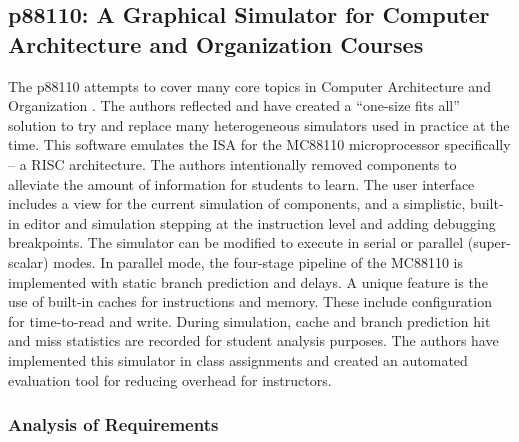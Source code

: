 \subsection{p88110: A Graphical Simulator for Computer Architecture and Organization Courses}
\label{sec:review-p88110}

The p88110 attempts to cover many core topics in Computer Architecture and Organization \cite{Garcia2009}. The authors reflected and have created a ``one-size fits all'' solution to try and replace many heterogeneous simulators used in practice at the time. This software emulates the ISA for the MC88110 microprocessor specifically -- a RISC architecture. The authors intentionally removed components to alleviate the amount of information for students to learn. The user interface includes a view for the current simulation of components, and a simplistic, built-in editor and simulation stepping at the instruction level and adding debugging breakpoints. The simulator can be modified to execute in serial or parallel (super-scalar) modes. In parallel mode, the four-stage pipeline of the MC88110 is implemented with static branch prediction and delays. A unique feature is the use of built-in caches for instructions and memory. These include configuration for time-to-read and write. During simulation, cache and branch prediction hit and miss statistics are recorded for student analysis purposes. The authors have implemented this simulator in class assignments and created an automated evaluation tool for reducing overhead for instructors. 

\subsubsection*{Analysis of Requirements}

